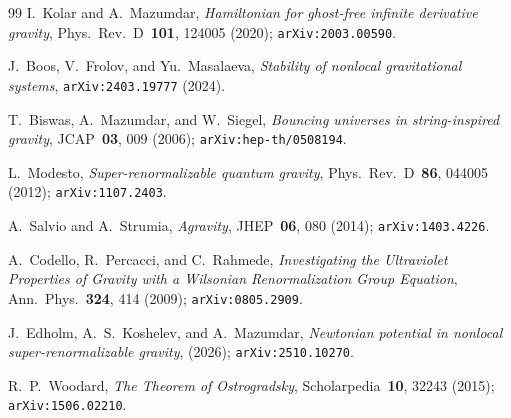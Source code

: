 \documentclass[11pt,a4paper]{article}
\theoremstyle{plain}
\theoremstyle{definition}
\theoremstyle{remark}
\begin{document}
\begin{thebibliography}{99}
I.~Kolar and A.~Mazumdar,
\textit{Hamiltonian for ghost-free infinite derivative gravity},
Phys.\ Rev.\ D~\textbf{101}, 124005 (2020);
\texttt{arXiv:2003.00590}.

J.~Boos, V.~Frolov, and Yu.~Masalaeva,
\textit{Stability of nonlocal gravitational systems},
\texttt{arXiv:2403.19777} (2024).

T.~Biswas, A.~Mazumdar, and W.~Siegel,
\textit{Bouncing universes in string-inspired gravity},
JCAP~\textbf{03}, 009 (2006);
\texttt{arXiv:hep-th/0508194}.

L.~Modesto,
\textit{Super-renormalizable quantum gravity},
Phys.\ Rev.\ D~\textbf{86}, 044005 (2012);
\texttt{arXiv:1107.2403}.

A.~Salvio and A.~Strumia,
\textit{Agravity},
JHEP~\textbf{06}, 080 (2014);
\texttt{arXiv:1403.4226}.

A.~Codello, R.~Percacci, and C.~Rahmede,
\textit{Investigating the Ultraviolet Properties of Gravity with a
Wilsonian Renormalization Group Equation},
Ann.\ Phys.~\textbf{324}, 414 (2009);
\texttt{arXiv:0805.2909}.

J.~Edholm, A.~S.~Koshelev, and A.~Mazumdar,
\textit{Newtonian potential in nonlocal super-renormalizable gravity},
(2026);
\texttt{arXiv:2510.10270}.

R.~P.~Woodard,
\textit{The Theorem of Ostrogradsky},
Scholarpedia~\textbf{10}, 32243 (2015);
\texttt{arXiv:1506.02210}.

\end{thebibliography}
\end{document}
